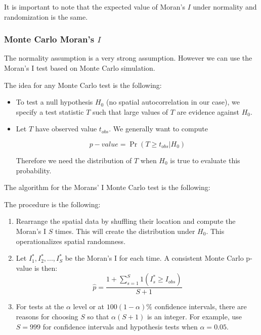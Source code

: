 It is important to note that the expected value of Moran's $I$ under normality and randomization is the same. 

\subsubsection{Monte Carlo Moran's $I$}

The normality assumption is a very strong assumption. However we can use the Moran’s I test based on Monte Carlo simulation.

The idea for any Monte Carlo test is the following: 

\begin{itemize}
  \item To test a null hypothesis $H_0$ (no spatial autocorrelation in our case), we specify a test statistic $T$ such that large values of $T$ are evidence against $H_0$.
  \item Let $T$ have observed value $t_{obs}$. We generally want to compute
  
  \begin{equation}
    p-value = \Pr(T\geq t_{obs}|H_0)
  \end{equation}
  
  Therefore we need the distribution of $T$ when $H_0$ is true to evaluate this probability.
\end{itemize}

The algorithm for the Morans' I Monte Carlo test is the following:

\begin{algorithm}
The procedure is the following:

\begin{enumerate}
\item Rearrange the spatial data by shuffling their location and compute the Moran's I $S$ times. This will create the distribution under $H_0$. This operationalizes spatial randomness. 
\item Let $I_1^*, I_2^*,..., I_S^*$ be the Moran's I for each time. A consistent Monte Carlo p-value is then:
  \begin{equation}
    \widehat{p} = \frac{1 + \sum_{s=1}^S 1(I^*_s \geq I_{obs})}{S + 1}
  \end{equation}
  \item For tests at the $\alpha$ level or at $100(1- \alpha)\%$ confidence intervals, there are reasons for choosing $S$ so that $\alpha(S + 1)$ is an integer. For example, use $S=999$ for confidence intervals and hypothesis tests when $\alpha = 0.05$.
\end{enumerate}
\end{algorithm}



